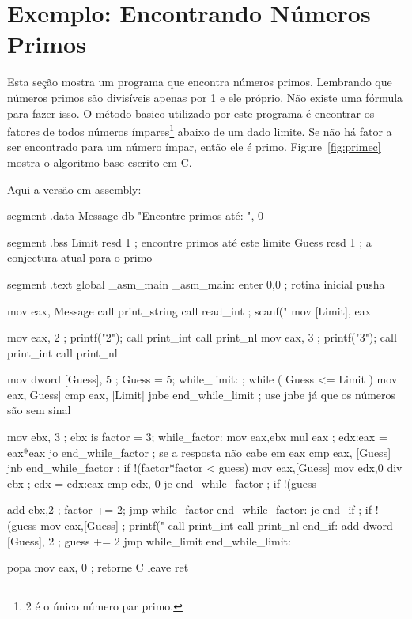 \section{Exemplo: Encontrando Números Primos}
Esta seção mostra um programa que encontra números primos. Lembrando que
números primos são divisíveis apenas por 1 e ele próprio. Não existe uma
fórmula para fazer isso. O método basico utilizado por este programa é
encontrar os fatores de todos números ímpares\footnote{2 é o único número par
primo.} abaixo de um dado limite. Se não há fator a ser encontrado para um número
ímpar, então ele é primo.  Figure~\ref{fig:primec} mostra o algoritmo
base escrito em C.

Aqui a versão em assembly:
\begin{AsmCodeListing}[label=prime.asm]
segment .data
Message         db      "Encontre primos até: ", 0

segment .bss
Limit           resd    1               ; encontre primos até este limite
Guess           resd    1               ; a conjectura atual para o primo

segment .text
        global  _asm_main
_asm_main:
        enter   0,0               ; rotina inicial
        pusha

        mov     eax, Message
        call    print_string
        call    read_int             ; scanf("%
        mov     [Limit], eax

        mov     eax, 2               ; printf("2\n");
        call    print_int
        call    print_nl
        mov     eax, 3               ; printf("3\n");
        call    print_int
        call    print_nl

        mov     dword [Guess], 5     ; Guess = 5;
while_limit:                         ; while ( Guess <= Limit )
        mov     eax,[Guess]
        cmp     eax, [Limit]
        jnbe    end_while_limit      ; use jnbe já que os números são sem sinal

        mov     ebx, 3               ; ebx is factor = 3;
while_factor:
        mov     eax,ebx
        mul     eax                  ; edx:eax = eax*eax
        jo      end_while_factor     ; se a resposta não cabe em eax
        cmp     eax, [Guess]
        jnb     end_while_factor     ; if !(factor*factor < guess)
        mov     eax,[Guess]
        mov     edx,0
        div     ebx                  ; edx = edx:eax %
        cmp     edx, 0
        je      end_while_factor     ; if !(guess %

        add     ebx,2                ; factor += 2;
        jmp     while_factor
end_while_factor:
        je      end_if               ; if !(guess %
        mov     eax,[Guess]          ; printf("%
        call    print_int
        call    print_nl
end_if:
        add     dword [Guess], 2     ; guess += 2
        jmp     while_limit
end_while_limit:

        popa
        mov     eax, 0            ; retorne C
        leave                     
        ret
\end{AsmCodeListing}
